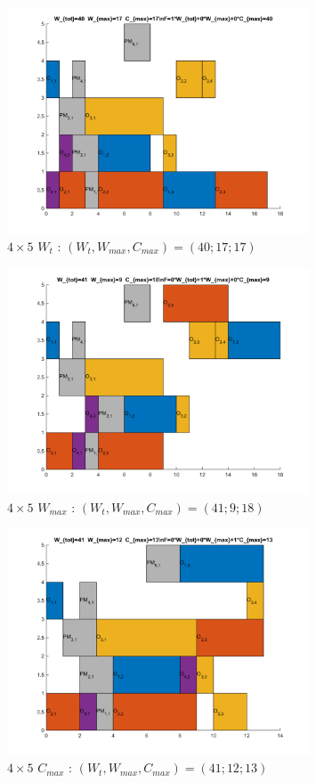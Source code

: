 \documentclass[10pt,a4paper]{scrartcl}
\begin{document}
\begin{figure}
  \centering
  \includegraphics[width=0.8\textwidth]{img/results4x5_Wtot.png}
  \caption{$4 \times 5$ $W_{t}$ : $(W_t, W_{max}, C_{max}) = (40; 17; 17)$}
\end{figure}
\begin{figure}
  \centering
  \includegraphics[width=0.8\textwidth]{img/results4x5_Wmax.png}
  \caption{$4 \times 5$ $W_{max}$ : $(W_t, W_{max}, C_{max}) = (41; 9; 18)$}
\end{figure}
\begin{figure}
  \centering
  \includegraphics[width=0.8\textwidth]{img/results4x5_Cmax.png}
  \caption{$4 \times 5$ $C_{max}$ : $(W_t, W_{max}, C_{max}) = (41; 12; 13)$}
\end{figure}
\end{document}
